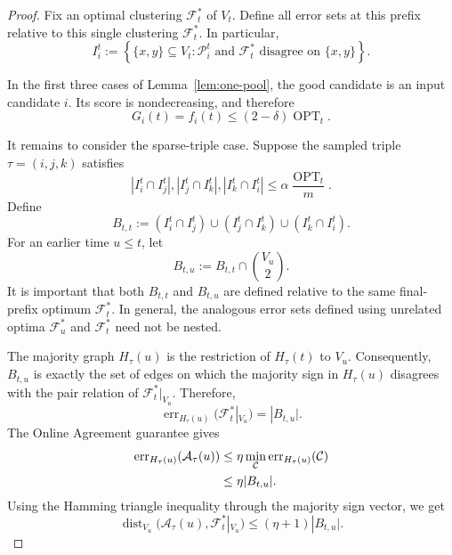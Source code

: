 \documentclass[11pt]{article}
\theoremstyle{definition}
\theoremstyle{remark}
\newcommand{\A}{\mathcal A}
\newcommand{\C}{\mathcal C}
\newcommand{\F}{\mathcal F}
\newcommand{\Pp}{\mathcal P}
\newcommand{\OPT}{\operatorname{OPT}}
\newcommand{\err}{\operatorname{err}}
\newcommand{\dist}{\operatorname{dist}}
\newcommand{\1}{\mathbf 1}
\begin{document}
\begin{proof}
Fix an optimal clustering $\F_t^*$ of $V_t$.  Define all error sets at this
prefix relative to this single clustering $\F_t^*$.  In particular,
\begin{equation}\label{eq:time-t-error-set}
 I_i^t
 :=
 \left\{
  \{x,y\}\subseteq V_t:
  \Pp_i^t\text{ and }\F_t^*
  \text{ disagree on }\{x,y\}
 \right\}.
\end{equation}

In the first three cases of Lemma~\ref{lem:one-pool}, the good candidate is
an input candidate $i$.  Its score is nondecreasing, and therefore
\[
 G_i(t)=f_i(t)\le(2-\delta)\OPT_t.
\]

It remains to consider the sparse-triple case.  Suppose the sampled triple
$\tau=(i,j,k)$ satisfies
\[
 |I_i^t\cap I_j^t|,
 |I_j^t\cap I_k^t|,
 |I_k^t\cap I_i^t|
 \le\alpha\frac{\OPT_t}{m}.
\]
Define
\begin{equation}\label{eq:Btt-definition}
 B_{t,t}
 :=
 (I_i^t\cap I_j^t)
 \cup(I_j^t\cap I_k^t)
 \cup(I_k^t\cap I_i^t).
\end{equation}
For an earlier time $u\le t$, let
\begin{equation}\label{eq:Btu-definition}
 B_{t,u}:=B_{t,t}\cap\binom{V_u}{2}.
\end{equation}
It is important that both $B_{t,t}$ and $B_{t,u}$ are defined relative to
the same final-prefix optimum $\F_t^*$.  In general, the analogous error
sets defined using unrelated optima $\F_u^*$ and $\F_t^*$ need not be
nested.

The majority graph $H_\tau(u)$ is the restriction of $H_\tau(t)$ to $V_u$.
Consequently, $B_{t,u}$ is exactly the set of edges on which the majority
sign in $H_\tau(u)$ disagrees with the pair relation of
$\F_t^*|_{V_u}$.  Therefore,
\begin{equation}\label{eq:restricted-opt-majority-error}
 \err_{H_\tau(u)}(\F_t^*|_{V_u})=|B_{t,u}|.
\end{equation}
The Online Agreement guarantee gives
\begin{align}
 \err_{H_\tau(u)}(\A_\tau(u))
 &\le\eta\min_{\C}\err_{H_\tau(u)}(\C)\notag\\
 &\le\eta|B_{t,u}|.                       \label{eq:agreement-history-bound}
\end{align}
Using the Hamming triangle inequality through the majority sign vector,
we get
\begin{equation}\label{eq:history-distance-bound}
 \dist_{V_u}(\A_\tau(u),\F_t^*|_{V_u})
 \le(\eta+1)|B_{t,u}|.
\end{equation}


\end{proof}
\end{document}
